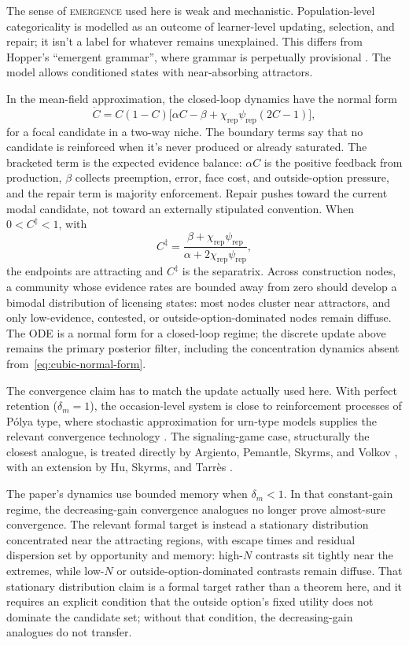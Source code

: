\documentclass[12pt,letterpaper]{article}
\newcommand{\term}[1]{\textsc{#1}}
\begin{document}
The sense of \term{emergence} used here is weak and mechanistic.
Population-level categoricality is modelled as an outcome of learner-level
updating, selection, and repair; it isn't a label for whatever remains
unexplained. This
differs from Hopper's \enquote{emergent grammar}, where grammar is perpetually
provisional \autocite{hopper1987}. The model allows conditioned states
with near-absorbing attractors.

In the mean-field approximation, the closed-loop dynamics have the normal form
\begin{equation}
\dot{C}=C(1-C)\bigl[\alpha C-\beta+
  \chi_{\mathrm{rep}}\psi_{\mathrm{rep}}(2C-1)\bigr],
\label{eq:cubic-normal-form}
\end{equation}
for a focal candidate in a two-way niche. The boundary terms say that no candidate
is reinforced when it's never produced or already saturated. The bracketed term
is the expected evidence balance: $\alpha C$ is the positive feedback from
production, $\beta$ collects preemption, error, face cost, and outside-option
pressure, and the repair term is majority enforcement. Repair pushes toward the
current modal candidate, not toward an externally stipulated convention. When
$0<C^\ddagger<1$, with
\[
C^\ddagger=\frac{\beta+\chi_{\mathrm{rep}}\psi_{\mathrm{rep}}}
{\alpha+2\chi_{\mathrm{rep}}\psi_{\mathrm{rep}}},
\]
the endpoints are attracting and $C^\ddagger$ is the separatrix. Across
construction nodes, a community whose evidence rates are bounded away from zero
should develop a bimodal distribution of licensing states: most nodes
cluster near attractors, and only low-evidence, contested, or
outside-option-dominated nodes remain diffuse. The ODE is a normal form for a
closed-loop regime; the discrete update above remains the primary posterior
filter, including the concentration dynamics absent from~\eqref{eq:cubic-normal-form}.

The convergence claim has to match the update actually used here. With perfect
retention ($\delta_m=1$), the
occasion-level system is close to reinforcement processes of Pólya type, where
stochastic approximation for urn-type models supplies the relevant convergence
technology \parencite{pemantle2007}. The signaling-game case, structurally the
closest analogue, is treated directly by Argiento, Pemantle, Skyrms, and Volkov
\parencite{argiento2009}, with an extension by Hu, Skyrms, and Tarrès
\parencite{huSkyrmsTarres2011}.

The paper's dynamics use bounded memory when $\delta_m<1$. In that
constant-gain regime, the decreasing-gain convergence analogues no longer prove
almost-sure convergence. The relevant formal target is instead a stationary
distribution concentrated near the attracting regions, with escape times and
residual dispersion set by opportunity and memory: high-$N$ contrasts sit
tightly near the extremes, while low-$N$ or outside-option-dominated contrasts
remain diffuse. That stationary distribution claim is a formal target rather
than a theorem here, and it requires an explicit condition that the outside
option's fixed utility does not dominate the candidate set; without that
condition, the decreasing-gain analogues do not transfer.
\end{document}
